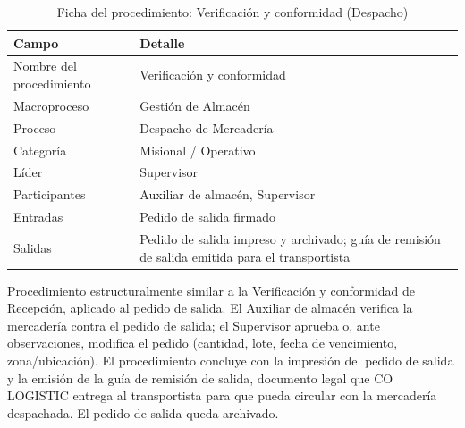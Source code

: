 \documentclass[11pt, a4paper, oneside]{report}
\begin{document}
\begin{table}[H]
\centering\small
\renewcommand{\arraystretch}{1.25}
\setlength{\tabcolsep}{6pt}
\begin{tabularx}{\textwidth}{|>{\raggedright\arraybackslash}p{}|>{\raggedright\arraybackslash}X|}
\hline
\rowcolor{upeu_mid}
\color{white}\bfseries Campo & \color{white}\bfseries Detalle \\ \hline
\rowcolor{gray!10}
Nombre del procedimiento & Verificación y conformidad \\ \hline
\rowcolor{gray!10}
Macroproceso & Gestión de Almacén \\ \hline
Proceso & Despacho de Mercadería \\ \hline
\rowcolor{gray!10}
Categoría & Misional / Operativo \\ \hline
Líder & Supervisor \\ \hline
\rowcolor{gray!10}
Participantes & Auxiliar de almacén, Supervisor \\ \hline
Entradas & Pedido de salida firmado \\ \hline
\rowcolor{gray!10}
Salidas & Pedido de salida impreso y archivado; guía de remisión de salida emitida para el transportista \\ \hline
\end{tabularx}
\caption{Ficha del procedimiento: Verificación y conformidad (Despacho)}
\end{table}

Procedimiento estructuralmente similar a la Verificación y conformidad de Recepción, aplicado al pedido de salida. El Auxiliar de almacén verifica la mercadería contra el pedido de salida; el Supervisor aprueba o, ante observaciones, modifica el pedido (cantidad, lote, fecha de vencimiento, zona/ubicación). El procedimiento concluye con la impresión del pedido de salida y la emisión de la guía de remisión de salida, documento legal que CO LOGISTIC entrega al transportista para que pueda circular con la mercadería despachada. El pedido de salida queda archivado.
\end{document}
